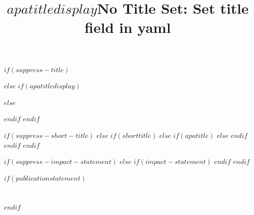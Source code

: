 $if(suppress-title)$
\title{}
$else$
$if(apatitledisplay)$
\title{$apatitledisplay$}
$else$
\title{No Title Set: Set title field in yaml}
$endif$
$endif$


$if(suppress-short-title)$
\shorttitle{}
$else$
$if(shorttitle)$
$else$
$if(apatitle)$
$else$
$endif$
$endif$
$endif$


\usepackage{etoolbox}

$if(suppress-impact-statement)$
$else$
$if(impact-statement)$
\makeatletter
\long\def\impactstatement#1{\long\def\@impactstatement{#1}}
\patchcmd{\maketitle}
  {}
  {
  }
  {}{}
\makeatother
\impactstatement{$impact-statement$}
$endif$
$endif$

$if(publicationstatement)$
\makeatletter
\patchcmd{\maketitle}
  {\vfill\section*{\normalfont\normalsize\textbf\acksname}}
  {\newpage\section*{\normalfont\normalsize\textbf\acksname}}
  {}{}
\makeatother
$endif$


